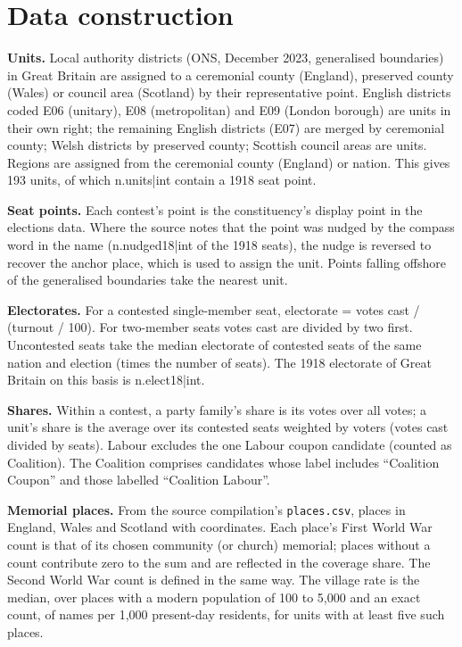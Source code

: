 \documentclass[11pt,a4paper]{article}
\begin{document}
\appendix
\section{Data construction}\label{app:data}
\textbf{Units.} Local authority districts (ONS, December 2023, generalised boundaries) in Great Britain are assigned to a ceremonial county (England), preserved county (Wales) or council area (Scotland) by their representative point. English districts coded E06 (unitary), E08 (metropolitan) and E09 (London borough) are units in their own right; the remaining English districts (E07) are merged by ceremonial county; Welsh districts by preserved county; Scottish council areas are units. Regions are assigned from the ceremonial county (England) or nation. This gives 193 units, of which {{n.units|int}} contain a 1918 seat point.

\textbf{Seat points.} Each contest's point is the constituency's display point in the elections data. Where the source notes that the point was nudged by the compass word in the name ({{n.nudged18|int}} of the 1918 seats), the nudge is reversed to recover the anchor place, which is used to assign the unit. Points falling offshore of the generalised boundaries take the nearest unit.

\textbf{Electorates.} For a contested single-member seat, electorate = votes cast / (turnout / 100). For two-member seats votes cast are divided by two first. Uncontested seats take the median electorate of contested seats of the same nation and election (times the number of seats). The 1918 electorate of Great Britain on this basis is {{n.elect18|int}}.

\textbf{Shares.} Within a contest, a party family's share is its votes over all votes; a unit's share is the average over its contested seats weighted by voters (votes cast divided by seats). Labour excludes the one Labour coupon candidate (counted as Coalition). The Coalition comprises candidates whose label includes ``Coalition Coupon'' and those labelled ``Coalition Labour''.

\textbf{Memorial places.} From the source compilation's \texttt{places.csv}, places in England, Wales and Scotland with coordinates. Each place's First World War count is that of its chosen community (or church) memorial; places without a count contribute zero to the sum and are reflected in the coverage share. The Second World War count is defined in the same way. The village rate is the median, over places with a modern population of 100 to 5,000 and an exact count, of names per 1,000 present-day residents, for units with at least five such places.
\end{document}
